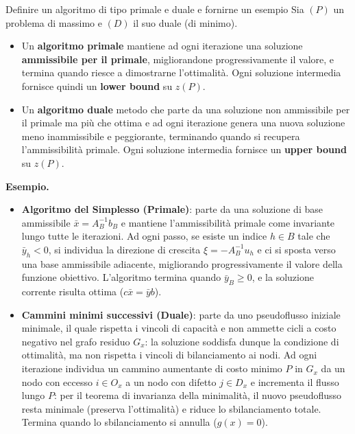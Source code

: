 \documentclass[12pt]{extarticle} %
\begin{document}
\begin{teoriabox}{Definire un algoritmo di tipo primale e duale e fornirne un esempio}
Sia $(P)$ un problema di massimo e $(D)$ il suo duale (di minimo).
\begin{itemize}
    \item Un \textbf{algoritmo primale} mantiene ad ogni iterazione una soluzione \textbf{ammissibile per il primale}, migliorandone progressivamente il valore, e termina quando riesce a dimostrarne l'ottimalità. Ogni soluzione intermedia fornisce quindi un \textbf{lower bound} su $z(P)$.
    \item Un \textbf{algoritmo duale} metodo che parte da una soluzione non ammissibile per il primale ma più che ottima e ad ogni iterazione genera una nuova soluzione meno inammissibile e peggiorante, terminando quando si recupera l'ammissibilità primale. Ogni soluzione intermedia fornisce un \textbf{upper bound} su $z(P)$.
\end{itemize}
\textbf{Esempio.}
\begin{itemize}
    \item \textbf{Algoritmo del Simplesso (Primale)}: parte da una soluzione di base ammissibile $\bar{x} = A_B^{-1}b_B$ e mantiene l'ammissibilità primale come invariante lungo tutte le iterazioni.
    Ad ogni passo, se esiste un indice $h \in B$ tale che $\bar{y}_h < 0$, si individua la direzione di crescita $\xi = -A_B^{-1}u_h$ e 
    ci si sposta verso una base ammissibile adiacente, migliorando progressivamente il valore della funzione obiettivo. 
    L'algoritmo termina quando $\bar{y}_B \ge 0$, e la soluzione corrente risulta ottima ($c\bar{x} = \bar{y}b$).

    \item \textbf{Cammini minimi successivi (Duale)}: parte da uno pseudoflusso iniziale minimale, il quale rispetta i vincoli di capacità e non ammette 
    cicli a costo negativo nel grafo residuo $G_x$: la soluzione soddisfa dunque la condizione di ottimalità, ma non rispetta i vincoli di bilanciamento ai nodi. 
    Ad ogni iterazione individua un cammino aumentante di costo minimo $P$ in $G_x$ da un nodo con eccesso $i \in O_x$ a un nodo con difetto $j \in D_x$ e 
    incrementa il flusso lungo $P$: per il teorema di invarianza della minimalità, il nuovo pseudoflusso resta minimale (preserva l'ottimalità) e riduce 
    lo sbilanciamento totale. Termina quando lo sbilanciamento si annulla ($g(x) = 0$).
\end{itemize}
\end{teoriabox}
\end{document}
